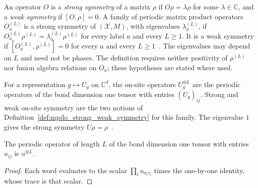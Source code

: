 \begin{definition}\label{def:mpdo_strong_weak_symmetry}
    \leanok
    An operator $O$ is a \emph{strong symmetry} of a matrix $\rho$ if
    $O\rho=\lambda\rho$ for some $\lambda\in\mathbb C$, and a \emph{weak
        symmetry} if $[O,\rho]=0$. A family of periodic matrix product operators
    $O_a^{(L)}$ is a strong symmetry of $(\mathcal X,M)$, with eigenvalues
    $\lambda_a^{(L)}$, if
    $O_a^{(L)}\rho^{(L)}=\lambda_a^{(L)}\rho^{(L)}$ for every label $a$ and
    every $L\ge 1$. It is a weak symmetry if
    $[O_a^{(L)},\rho^{(L)}]=0$ for every $a$ and every
    $L\ge 1$~\cite{Sun2025Anomalous}. The eigenvalues may depend on $L$ and
    need not be phases. The definition requires neither positivity of
    $\rho^{(L)}$ nor fusion algebra relations on $O_a$; these hypotheses are
    stated where used.
\end{definition}

\begin{definition}\label{def:mpdo_onsite_symmetry}
    \leanok
    For a representation $g\mapsto U_g$ on $\mathbb C^d$, the on-site
    operators $U_g^{\otimes L}$ are the periodic operators of the bond
    dimension one tensor with entries $(U_g)_{ij}$. Strong and weak on-site
    symmetry are the two notions of
    Definition~\ref{def:mpdo_strong_weak_symmetry} for this family. The
    eigenvalue $1$ gives the strong symmetry
    $U\rho=\rho$~\cite{GarreRubio2026LocalCharacterization}.
\end{definition}

\begin{lemma}\label{thm:mpdo_onsite_mpo}
    \leanok
    The periodic operator of length $L$ of the bond dimension one tensor
    with entries $u_{ij}$ is $u^{\otimes L}$.
\end{lemma}

\begin{proof}\leanok
    Each word evaluates to the scalar $\prod_l u_{\sigma_l\tau_l}$ times the
    one-by-one identity, whose trace is that scalar.
\end{proof}

